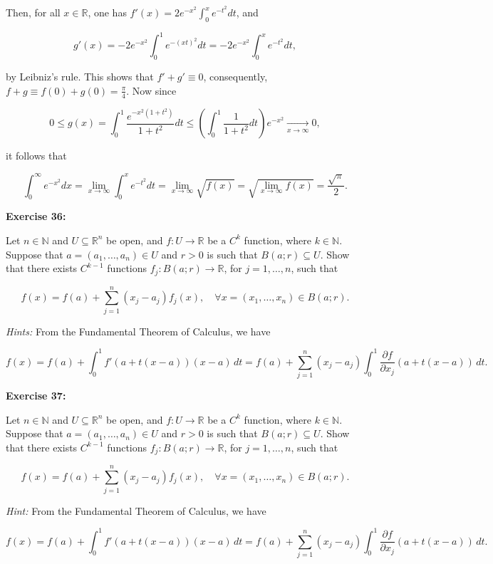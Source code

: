 \documentclass{book}
\begin{document}
Then, for all $x \in \mathbb{R}$, one has $f'(x) = 2e^{-x^2} \int_0^x e^{-t^2} dt$, and

\[
g'(x) = -2e^{-x^2} \int_0^1 e^{-(xt)^2} dt = -2e^{-x^2} \int_0^x e^{-t^2} dt,
\]

by Leibniz's rule. This shows that $f' + g' \equiv 0$, consequently, $f + g \equiv f(0) + g(0) = \frac{\pi}{4}$. Now since

\[
0 \leq g(x) = \int_0^1 \frac{e^{-x^2(1+t^2)}}{1+t^2} dt \leq \left( \int_0^1 \frac{1}{1+t^2} dt \right) e^{-x^2} \xrightarrow[x \to \infty]{} 0,
\]

it follows that

\[
\int_0^{\infty} e^{-x^2} dx = \lim_{x \to \infty} \int_0^x e^{-t^2} dt = \lim_{x \to \infty} \sqrt{f(x)} = \sqrt{\lim_{x \to \infty} f(x)} = \frac{\sqrt{\pi}}{2}.
\]


\textbf{Exercise 36:}

Let $n \in \mathbb{N}$ and $U \subseteq \mathbb{R}^n$ be open, and $f : U \to \mathbb{R}$ be a $C^k$ function, where $k \in \mathbb{N}$. Suppose that $a = (a_1, \ldots, a_n) \in U$ and $r > 0$ is such that $B(a; r) \subseteq U$. Show that there exists $C^{k-1}$ functions $f_j : B(a; r) \to \mathbb{R}$, for $j = 1, \ldots, n$, such that

\[
f(x) = f(a) + \sum_{j=1}^{n} (x_j - a_j) f_j(x), \quad \forall x = (x_1, \ldots, x_n) \in B(a; r).
\]

\textit{Hints:} From the Fundamental Theorem of Calculus, we have

\[
f(x) = f(a) + \int_0^1 f'(a + t(x - a))(x - a) \, dt
= f(a) + \sum_{j=1}^{n} (x_j - a_j) \int_0^1 \frac{\partial f}{\partial x_j}(a + t(x - a)) \, dt.
\]

\textbf{Exercise 37:}

Let $n \in \mathbb{N}$ and $U \subseteq \mathbb{R}^n$ be open, and $f : U \to \mathbb{R}$ be a $C^k$ function, where $k \in \mathbb{N}$. Suppose that $a = (a_1, \ldots, a_n) \in U$ and $r > 0$ is such that $B(a; r) \subseteq U$. Show that there exists $C^{k-1}$ functions $f_j : B(a; r) \to \mathbb{R}$, for $j = 1, \ldots, n$, such that

\[
f(x) = f(a) + \sum_{j=1}^{n} (x_j - a_j) f_j(x), \quad \forall x = (x_1, \ldots, x_n) \in B(a; r).
\]

\textit{Hint:} From the Fundamental Theorem of Calculus, we have

\[
f(x) = f(a) + \int_0^1 f'(a + t(x - a))(x - a)\, dt
= f(a) + \sum_{j=1}^{n} (x_j - a_j) \int_0^1 \frac{\partial f}{\partial x_j}(a + t(x - a))\, dt.
\]
\end{document}
